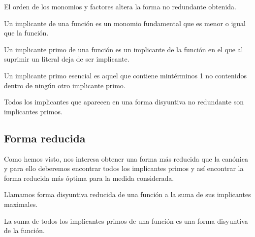 \begin{ejemplo}
    \begin{obs}
        El orden de los monomios y factores altera la forma no redundante obtenida.
    \end{obs}
\end{ejemplo}
\smallskip
\begin{ndef}[Implicante]
    Un implicante de una función es un monomio fundamental que es menor o igual que la función.
\end{ndef}

\begin{ndef}
    Un implicante primo de una función es un implicante de la función en el que al suprimir un literal deja de ser implicante.
\end{ndef}

\begin{ndef}
    Un implicante primo esencial es aquel que contiene mintérminos 1 no contenidos dentro de ningún otro implicante primo.
\end{ndef}

\begin{nota}
    Todos los implicantes que aparecen en una forma disyuntiva no redundante son implicantes primos.
\end{nota}

\subsection{Forma reducida}
Como hemos visto, nos interesa obtener una forma más reducida que la canónica y para ello deberemos encontrar todos los implicantes primos y así encontrar la forma reducida más óptima para la medida considerada.
\begin{ndef}
    Llamamos forma disyuntiva reducida de una función a la suma de sus implicantes maximales.
\end{ndef}
\begin{nth}
    La suma de todos los implicantes primos de una función es una forma disyuntiva de la función.
\end{nth}

